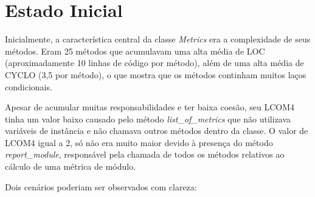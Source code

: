 \section{Estado Inicial}
Inicialmente, a característica central da classe \textit{Metrics} era a complexidade de seus métodos.
Eram 25 métodos que acumulavam uma alta média de LOC (aproximadamente 10 linhas de código por método),
além de uma alta média de CYCLO (3,5 por método), o que mostra que os métodos continham muitos laços condicionais.

Apesar de acumular muitas responsabilidades e ter baixa coesão, seu LCOM4 tinha um valor baixo
causado pelo método \textit{list\_of\_metrics} que não utilizava variáveis de instância e não chamava
outros métodos dentro da classe. O valor de LCOM4 igual a 2, só não era muito maior devido à presença
do método \textit{report\_module}, responsável pela chamada de todos os métodos relativos ao cálculo de
uma métrica de módulo.

Dois cenários poderiam ser observados com clareza:

